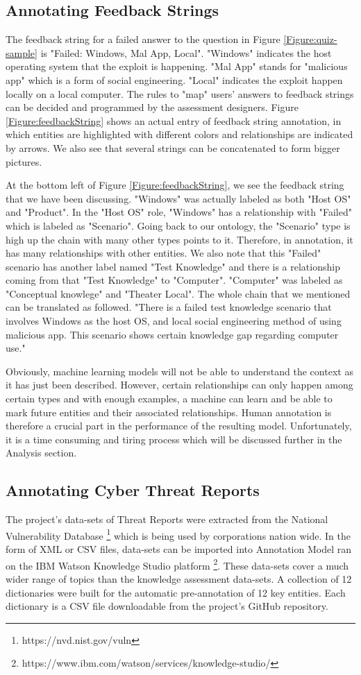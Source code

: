 \documentclass[conference]{IEEEtran}
\begin{document}
\subsection{Annotating Feedback Strings}
The feedback string for a failed answer to the question in Figure \ref{Figure:quiz-sample} is "Failed: Windows, Mal App, Local". "Windows" indicates the host operating system that the exploit is happening. "Mal App" stands for "malicious app" which is a form of social engineering. "Local" indicates the exploit happen locally on a local computer. The rules to "map" users' answers to feedback strings can be decided and programmed by the assessment designers. Figure \ref{Figure:feedbackString} shows an actual entry of feedback string annotation, in which entities are highlighted with different colors and relationships are indicated by arrows. We also see that several strings can be concatenated to form bigger pictures.

At the bottom left of Figure \ref{Figure:feedbackString}, we see the feedback string that we have been discussing. "Windows" was actually labeled as both "Host OS" and "Product". In the "Host OS" role, "Windows" has a relationship with "Failed" which is labeled as "Scenario". Going back to our ontology, the "Scenario" type is high up the chain with many other types points to it. Therefore, in annotation, it has many relationships with other entities. We also note that this "Failed" scenario has another label named "Test Knowledge" and there is a relationship coming from that "Test Knowledge" to "Computer". "Computer" was labeled as "Conceptual knowlege" and "Theater Local". The whole chain that we mentioned can be translated as followed. "There is a failed test knowledge scenario that involves Windows as the host OS, and local social engineering method of using malicious app. This scenario shows certain knowledge gap regarding computer use."

Obviously, machine learning models will not be able to understand the context as it has just been described. However, certain relationships can only happen among certain types and with enough examples, a machine can learn and be able to mark future entities and their associated relationships. Human annotation is therefore a crucial part in the performance of the resulting model. Unfortunately, it is a time consuming and tiring process which will be discussed further in the Analysis section.

\subsection{Annotating Cyber Threat Reports} 
The project's data-sets of Threat Reports were extracted from the National Vulnerability Database \footnote{https://nvd.nist.gov/vuln} which is being used by corporations nation wide. In the form of XML or CSV files, data-sets can be imported into Annotation Model ran on the IBM Watson Knowledge Studio platform \footnote{https://www.ibm.com/watson/services/knowledge-studio/}. These data-sets cover a much wider range of topics than the knowledge assessment data-sets. A collection of 12 dictionaries were built for the automatic pre-annotation of 12 key entities. Each dictionary is a CSV file downloadable from the project's GitHub repository.
\end{document}
